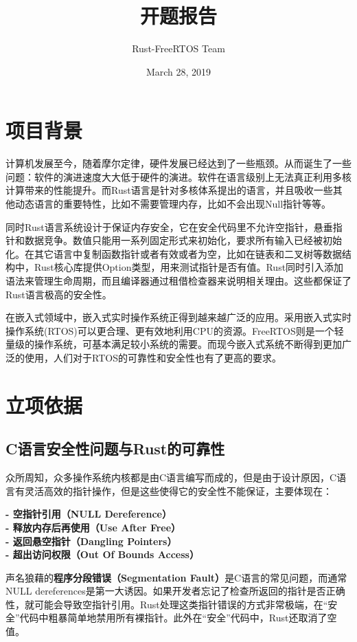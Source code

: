 \documentclass[12pt, a4paper]{article}
\title{开题报告}
\author{Rust-FreeRTOS Team}
\date{March 28, 2019}
\begin{document}
	\maketitle
	\clearpage
	\tableofcontents
	\clearpage
	\section{项目背景}
	计算机发展至今，随着摩尔定律，硬件发展已经达到了一些瓶颈。从而诞生了一些问题：软件的演进速度大大低于硬件的演进。软件在语言级别上无法真正利用多核计算带来的性能提升。而Rust语言是针对多核体系提出的语言，并且吸收一些其他动态语言的重要特性，比如不需要管理内存，比如不会出现Null指针等等。
	
	同时Rust语言系统设计于保证内存安全，它在安全代码里不允许空指针，悬垂指针和数据竞争。数值只能用一系列固定形式来初始化，要求所有输入已经被初始化。在其它语言中复制函数指针或者有效或者为空，比如在链表和二叉树等数据结构中，Rust核心库提供Option类型，用来测试指针是否有值。Rust同时引入添加语法来管理生命周期，而且编译器通过租借检查器来说明相关理由。这些都保证了Rust语言极高的安全性。
	
	在嵌入式领域中，嵌入式实时操作系统正得到越来越广泛的应用。采用嵌入式实时操作系统(RTOS)可以更合理、更有效地利用CPU的资源。FreeRTOS则是一个轻量级的操作系统，可基本满足较小系统的需要。而现今嵌入式系统不断得到更加广泛的使用，人们对于RTOS的可靠性和安全性也有了更高的要求。
	\section{立项依据}
	\subsection{C语言安全性问题与Rust的可靠性}
	众所周知，众多操作系统内核都是由C语言编写而成的，但是由于设计原因，C语言有灵活高效的指针操作，但是这些使得它的安全性不能保证，主要体现在：
	
\textbf{- 空指针引用（NULL Dereference）\\
		- 释放内存后再使用（Use After Free）\\
		- 返回悬空指针（Dangling Pointers）\\
		- 超出访问权限（Out Of Bounds Access）}
	
	声名狼藉的\textbf{程序分段错误（Segmentation Fault）}是C语言的常见问题，而通常NULL dereferences是第一大诱因。如果开发者忘记了检查所返回的指针是否正确性，就可能会导致空指针引用。Rust处理这类指针错误的方式非常极端，在“安全”代码中粗暴简单地禁用所有裸指针。此外在“安全”代码中，Rust还取消了空值。
	
\end{document}
